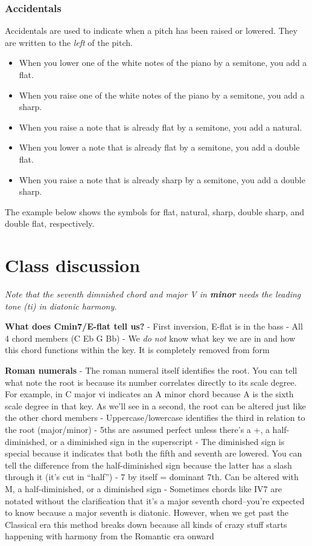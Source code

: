 \documentclass{book}
\providecommand{\tightlist}{%
  \setlength{\itemsep}{0pt}\setlength{\parskip}{0pt}}
\begin{document}
\hypertarget{accidentals}{%
\subsection{Accidentals}\label{accidentals}}

Accidentals are used to indicate when a pitch has been raised or lowered. They
are written to the \emph{left} of the pitch.

\begin{itemize}
\tightlist
\item
  When you lower one of the white notes of the piano by a semitone, you add a
  flat.
\item
  When you raise one of the white notes of the piano by a semitone, you add a
  sharp.
\item
  When you raise a note that is already flat by a semitone, you add a natural.
\item
  When you lower a note that is already flat by a semitone, you add a double
  flat.
\item
  When you raise a note that is already sharp by a semitone, you add a double
  sharp.
\end{itemize}

The example below shows the symbols for flat, natural, sharp, double sharp,
and double flat, respectively.

\hypertarget{class-discussion-8}{%
\chapter{Class discussion}\label{class-discussion-8}}

\emph{Note that the seventh dimnished chord and major V in \textbf{minor}
needs the leading tone (ti) in diatonic harmony.}

\textbf{What does Cmin7/E-flat tell us?} - First inversion, E-flat is in the
bass - All 4 chord members (C Eb G Bb) - We \emph{do not} know what key we are
in and how this chord functions within the key. It is completely removed from
form

\textbf{Roman numerals} - The roman numeral itself identifies the root. You
can tell what note the root is because its number correlates directly to its
scale degree. For example, in C major vi indicates an A minor chord because A
is the sixth scale degree in that key. As we'll see in a second, the root can
be altered just like the other chord members - Uppercase/lowercase identifies
the third in relation to the root (major/minor) - 5ths are assumed perfect
unless there's a +, a half-diminished, or a diminished sign in the superscript
- The diminished sign is special because it indicates that both the fifth and
seventh are lowered. You can tell the difference from the half-diminished sign
because the latter has a slash through it (it's cut in ``half'') - 7 by itself
= dominant 7th. Can be altered with M, a half-diminished, or a diminished sign
- Sometimes chords like IV7 are notated without the clarification that it's a
major seventh chord--you're expected to know because a major seventh is
diatonic. However, when we get past the Classical era this method breaks down
because all kinds of crazy stuff starts happening with harmony from the
Romantic era onward
\end{document}
